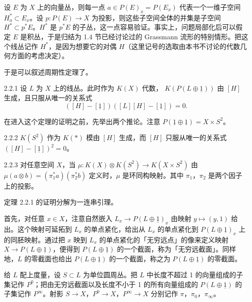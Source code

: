 设 $E$ 为 $X$ 上的向量丛，则每一点 $a\in P(E)_x=P(E_x)$ 代表一个一维子空间 $H_a^{*}\subset E_x$。设 $p\colon P(E)\to X$ 为投影，则这些子空间全体的并集是子空间 $H^{*}\subset p^{*}E$。$H^{*}$ 是 $p^{*}E$ 的子丛，这一点容易验证。事实上，问题局部化后可以假定 $E$ 是积丛，于是归结为 1.4 节已经讨论过的 Grassmann 流形的特别情形。把这个线丛记作 $H^{*}$，是因为想要它的对偶 $H$（这里记号的选取由本书不讨论的代数几何方面的考虑决定）。

于是可以叙述周期性定理了。
\begin{theorem*}{2.2.1}
  设 $L$ 为 $X$ 上的线丛。此时作为 $K(X)$ 代数，
  $K(P(L\oplus\underline{1}))$ 由 $[H]$ 生成，且只服从唯一的关系式
  \[
  ([H]-[\underline{1}])([L][H]-[\underline{1}])=0.
  \]
\end{theorem*}

在进入这个定理的证明之前，先举出两个推论。注意 $P(\underline{1}\oplus\underline{1})=X\times S^2$。

\begin{corollary*}{2.2.2}
  $K(S^2)$ 作为 $K(*)$ 模由 $[H]$ 生成，而 $[H]$ 只服从唯一的关系式 $([H]-[\underline{1}])^2=0$。
\end{corollary*}

\begin{corollary*}{2.2.3}
  对任意空间 $X$，当 $\mu\colon K(X)\otimes K(S^2)\to K(X\times S^2)$ 由 $\mu(a\otimes b)=(\pi_1^{*}a)(\pi_2^{*}b)$ 定义时，$\mu$ 是环同构映射。其中 $\pi_1$，$\pi_2$ 是两个因子上的投影。
\end{corollary*}

定理 2.2.1 的证明分解为一连串引理。

首先，对任意 $x\in X$，注意自然嵌入 $L_x\to P(L\oplus\underline{1})_x$ 由映射 $y\mapsto(y,1)$ 给出。这个映射可延拓到 $L_x$ 的单点紧化，给出从 $L_x$ 的单点紧化到 $P(L\oplus\underline{1})_x$ 上的同胚映射。通过把 $x$ 映到 $L_x$ 的单点紧化的「无穷远点」的像来定义映射 $X\to P(L\oplus\underline{1})$，便得到 $P(L\oplus\underline{1})$ 的一个截面，称为「无穷远截面」。同样地，$L$ 的零截面也给出 $P(L\oplus\underline{1})$ 的一个截面，称之为 $P(L\oplus\underline{1})$ 的零截面。

给 $L$ 配上度量，设 $S\subset L$ 为单位圆周丛。把 $L$ 中长度不超过 1 的向量组成的子集记作 $P^0$；把由无穷远截面以及长度不小于 1 的所有向量组成的 $P(L\oplus\underline{1})$ 的子集记作 $P^\infty$。射影 $S\to X$，$P^0\to X$，$P^\infty\to X$ 分别记作 $\pi$，$\pi_0$，$\pi_\infty$。

